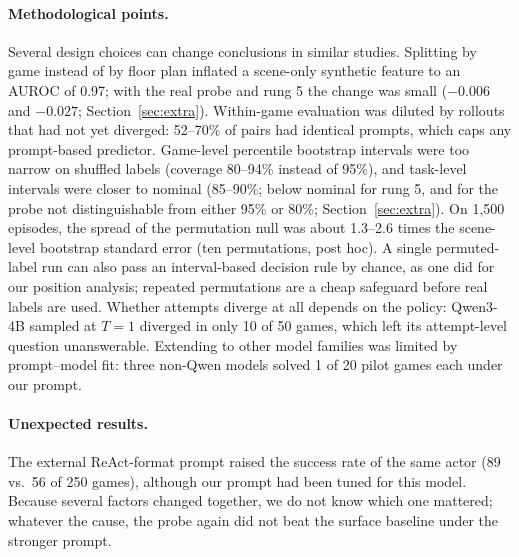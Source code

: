 \documentclass[11pt]{article}
\begin{document}
\paragraph{Methodological points.} Several design choices can change conclusions in similar studies. Splitting by game instead of by floor plan inflated a scene-only synthetic feature to an AUROC of 0.97; with the real probe and rung 5 the change was small ($-0.006$ and $-0.027$; Section~\ref{sec:extra}).
Within-game evaluation was diluted by rollouts that had not yet diverged: 52--70\% of pairs had identical prompts, which caps any prompt-based predictor. Game-level percentile bootstrap intervals were too narrow on shuffled labels (coverage 80--94\% instead of 95\%), and task-level intervals were closer to nominal (85--90\%; below nominal for rung 5, and for the probe not distinguishable from either 95\% or 80\%; Section~\ref{sec:extra}). On 1,500 episodes, the spread of the permutation null was about 1.3--2.6 times the scene-level bootstrap standard error (ten permutations, post hoc). A single permuted-label run can also pass an interval-based decision rule by chance, as one did for our position analysis; repeated permutations are a cheap safeguard before real labels are used.
Whether attempts diverge at all depends on the policy: Qwen3-4B sampled at $T = 1$ diverged in only 10 of 50 games, which left its attempt-level question unanswerable. Extending to other model families was limited by prompt--model fit: three non-Qwen models solved 1 of 20 pilot games each under our prompt.

\paragraph{Unexpected results.} The external ReAct-format prompt raised the success rate of the same actor (89 vs.\ 56 of 250 games), although our prompt had been tuned for this model. Because several factors changed together, we do not know which one mattered; whatever the cause, the probe again did not beat the surface baseline under the stronger prompt.
\end{document}
